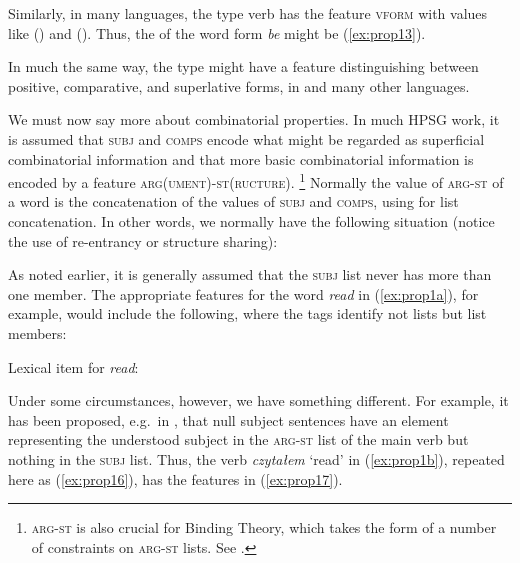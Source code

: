 \documentclass[output=paper,biblatex,babelshorthands,newtxmath,draftmode,colorlinks,citecolor=brown]{langscibook}
\begin{document}
\ea\label{ex:prop12}
\z

\noindent
Similarly, in many languages, the type verb has the feature \textsc{vform} with values like
() and (). Thus, the \headv
of the word form \emph{be} might be (\ref{ex:prop13}).

\ea\label{ex:prop13}
\z

\noindent
In much the same way, the type  might have a feature distinguishing between positive, comparative, and superlative forms, in  and many other languages.

We must now say more about combinatorial properties. In much HPSG work, it is assumed that \textsc{subj} and \textsc{comps} encode what might be regarded as superficial combinatorial information and that more basic combinatorial information is encoded by a feature \textsc{arg(ument)-st(ructure)}.%
%
\footnote{\textsc{arg-st} is also crucial for Binding Theory, which takes the form of a number of constraints on \textsc{arg-st} lists. See .}
%
Normally the value of \textsc{arg-st} of a word is the concatenation of the values of \textsc{subj} and \textsc{comps}, using \isi{$\oplus$} for list concatenation. In other words, we normally have the following situation (notice the use of re-entrancy or structure sharing):

\ea\label{ex:prop14}
\z

\noindent
As noted earlier, it is generally assumed that the \textsc{subj} list never has more than one member. The appropriate features for the word \emph{read} in (\ref{ex:prop1a}), for example, would include the following, where the tags identify not lists but list members:

\eas
\label{ex:prop15}%
Lexical item for \emph{read}:\\
\zs

\noindent
Under some circumstances, however, we have something different. For example, it has been proposed, e.g.\ in \citet[65]{MS99a}, that null subject sentences have an element representing the understood subject in the \textsc{arg-st} list of the main verb but nothing in the \textsc{subj} list. Thus, the verb \emph{czytałem} `read' in (\ref{ex:prop1b}), repeated here as (\ref{ex:prop16}), has the features in (\ref{ex:prop17}).
\end{document}
